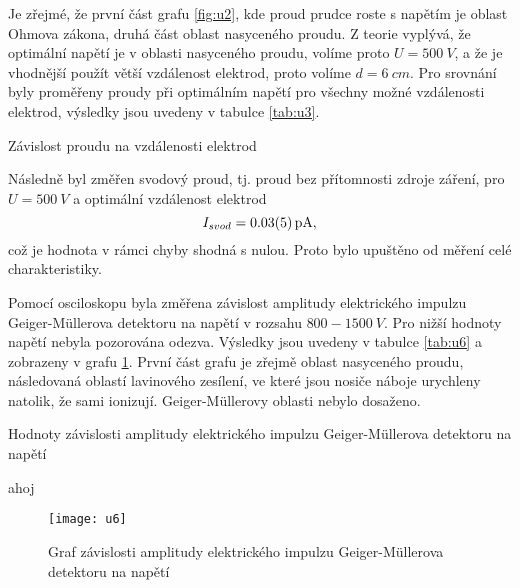 \documentclass{protokol}
\begin{document}
    Je zřejmé, že první část grafu \ref{fig:u2}, kde proud prudce roste s napětím je oblast Ohmova zákona, druhá část oblast nasyceného proudu. Z teorie vyplývá, že optimální napětí je v oblasti nasyceného proudu, volíme proto $U = \SI{500}{V}$, a že je vhodnější použít větší vzdálenost elektrod, proto volíme $d = \SI{6}{cm}$. Pro srovnání byly proměřeny proudy při optimálním napětí pro všechny možné vzdálenosti elektrod, výsledky jsou uvedeny v tabulce \ref{tab:u3}.
    
    \begin{wraptable}[13]{R}{0.25\textwidth}
      \centering
      \setlength{\tabcolsep}{10pt}
      
      \caption{Závislost proudu na vzdálenosti elektrod}
      \label{tab:u3}
    \end{wraptable}

    Následně byl změřen svodový proud, tj. proud bez přítomnosti zdroje záření, pro $U = \SI{500}{V}$ a optimální vzdálenost elektrod
    $$ I_{svod} = \SI{0.03 \pm 0.05}{pA},$$
    což je hodnota v rámci chyby shodná s nulou. Proto bylo upuštěno od měření celé charakteristiky.
    
    
    Pomocí osciloskopu byla změřena závislost amplitudy elektrického impulzu Geiger-Müllerova detektoru na napětí v rozsahu $800-\SI{1500}{V}$. Pro nižší hodnoty napětí nebyla pozorována odezva. Výsledky jsou uvedeny v tabulce \ref{tab:u6} a zobrazeny v grafu \ref{fig:u6}. První část grafu je zřejmě oblast nasyceného proudu, následovaná oblastí lavinového zesílení, ve které jsou nosiče náboje urychleny natolik, že sami ionizují. Geiger-Müllerovy oblasti nebylo dosaženo.
    
    \begin{wraptable}[7]{R}{0.3\textwidth}
      \centering
      \setlength{\tabcolsep}{10pt}
      
      \caption{Hodnoty závislosti amplitudy elektrického impulzu Geiger-Müllerova detektoru na napětí}
      \label{tab:u6}
    \end{wraptable}  

    ahoj
    \vspace{-30pt}
    \begin{figure}[H] 
      \begin{minipage}{0.7\textwidth}
        \centering
        \texttt{[image: u6]}
        \caption{Graf závislosti amplitudy elektrického impulzu Geiger-Müllerova detektoru na napětí}
        \label{fig:u6}
      \end{minipage}
    \end{figure}
    \vspace{-22pt}
    
\end{document}
